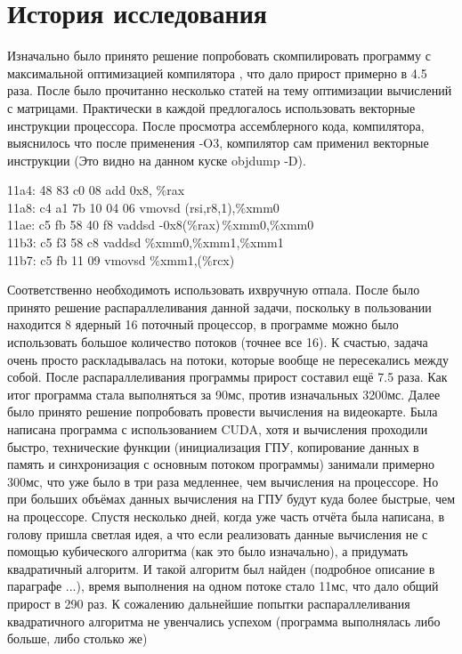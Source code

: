 \documentclass[a4peper, 12pt, titlepage, finall]{extreport}
\begin{document}
    \section{История исследования}
        Изначально было принято решение попробовать скомпилировать программу с максимальной оптимизацией компилятора {}, что дало прирост примерно в 4.5 раза. 
        После было прочитанно несколько статей на тему оптимизации вычислений с матрицами. 
        Практически в каждой предлогалось использовать векторные инструкции процессора. 
        После просмотра ассемблерного кода, компилятора, выяснилось что после применения {\ttfamily -O3}, компилятор сам применил векторные инструкции (Это видно на данном куске {\ttfamily objdump -D}). \\
    


        {
            \setlength{\parindent}{0em}

            {
                \setlength{\leftskip}{3em} \ttfamily
                11a4:	48 83 c0 08          	add    0x8, \%rax \\
                11a8:	c4 a1 7b 10 04 06    	vmovsd (rsi,r8,1),\%xmm0\\
                11ae:	c5 fb 58 40 f8       	vaddsd -0x8(\%rax)\,\%xmm0,\%xmm0\\
                11b3:	c5 f3 58 c8          	vaddsd \%xmm0,\%xmm1,\%xmm1\\
                11b7:	c5 fb 11 09          	vmovsd \%xmm1,(\%rcx) \\
    
            }
        }
        Соответственно необходимоть использовать ихвручную отпала. После было принято решение распараллеливания данной задачи, поскольку в пользовании
        находится 8 ядерный 16 поточный процессор, в программе можно было использовать большое количество потоков (точнее все 16). 
        К счастью, задача очень просто раскладывалась на потоки, которые вообще не пересекались между собой. 
        После распараллеливания программы прирост составил ещё 7.5 раза. Как итог программа стала выполняться за 90мс, против изначальных 3200мс.
        Далее было принято решение попробовать провести вычисления на видеокарте. Была написана программа с использованием CUDA, 
        хотя и вычисления проходили быстро, технические функции (инициализация ГПУ, 
        копирование данных в память и синхронизация с основным потоком программы) занимали примерно 300мс, что уже было в три раза
        медленнее, чем вычисления на процессоре. Но при больших объёмах данных вычисления
        на ГПУ будут куда более быстрые, чем на процессоре.
        Спустя несколько дней, когда уже часть отчёта была написана, в голову пришла светлая
        идея, а что если реализовать данные вычисления не с помощью кубического алгоритма (как
        это было изначально), а придумать квадратичный алгоритм. И такой алгоритм был найден
        (подробное описание в параграфе ...), время выполнения на одном потоке стало 11мс, что
        дало общий прирост в 290 раз. К сожалению дальнейшие попытки распараллеливания
        квадратичного алгоритма не увенчались успехом (программа выполнялась либо больше,
        либо столько же)
\end{document}
